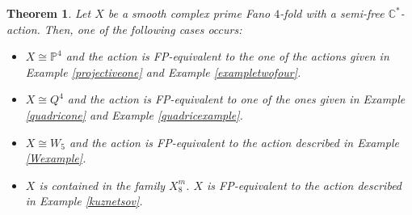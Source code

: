 \documentclass[12pt]{article}
\newtheorem{theorem}{Theorem}[section]
\begin{document}
\begin{theorem} \label{fpequivalent}
Let $X$ be a smooth complex prime Fano $4$-fold with a semi-free $\mathbb{C}^*$-action. Then, one of the following cases occurs: \begin{itemize}
\item[a).] $X \cong \mathbb{P}^4$ and the action is FP-equivalent to the one of the actions given in Example \ref{projectiveone} and Example \ref{exampletwofour}.
\item[b).] $X \cong Q^4$ and the action is FP-equivalent to one of the ones given in Example \ref{quadricone} and Example \ref{quadricexample}.
\item[c).] $X \cong W_5$ and the action is FP-equivalent to the action described in Example  \ref{Wexample}.

\item[d).] $X$ is contained in the family $ X^{m}_{8}$. $X$ is FP-equivalent to the action described in Example \ref{kuznetsov}.
\end{itemize}

\end{theorem}
\end{document}
